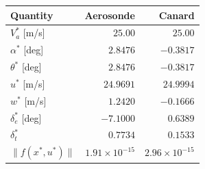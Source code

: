 \begin{tabular}{lrr}
\toprule
Quantity & Aerosonde & Canard \\
\midrule
$V_a^*$ [m/s] & $25.00$ & $25.00$ \\
$\alpha^*$ [deg] & $2.8476$ & $-0.3817$ \\
$\theta^*$ [deg] & $2.8476$ & $-0.3817$ \\
$u^*$ [m/s] & $24.9691$ & $24.9994$ \\
$w^*$ [m/s] & $1.2420$ & $-0.1666$ \\
$\delta_e^*$ [deg] & $-7.1000$ & $0.6389$ \\
$\delta_t^*$ & $0.7734$ & $0.1533$ \\
$\lVert f(x^*,u^*)\rVert$ & $1.91\times 10^{-15}$ & $2.96\times 10^{-15}$ \\
\bottomrule
\end{tabular}
